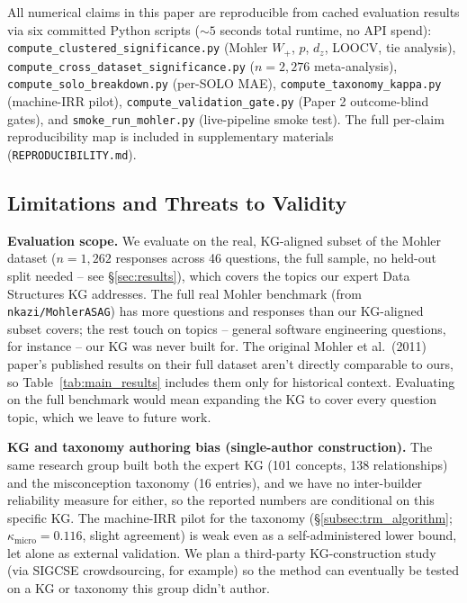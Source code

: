\documentclass[conference]{IEEEtran}
\begin{document}
All numerical claims in this paper are reproducible from cached evaluation
results via six committed Python scripts ($\sim 5$ seconds total runtime,
no API spend): \texttt{compute\_clustered\_significance.py} (Mohler $W_+$,
$p$, $d_z$, LOOCV, tie analysis), \texttt{compute\_cross\_dataset\_significance.py}
($n=2{,}276$ meta-analysis), \texttt{compute\_solo\_breakdown.py}
(per-SOLO MAE), \texttt{compute\_taxonomy\_kappa.py} (machine-IRR pilot),
\texttt{compute\_validation\_gate.py} (Paper 2 outcome-blind gates), and
\texttt{smoke\_run\_mohler.py} (live-pipeline smoke test). The full
per-claim reproducibility map is included in supplementary materials
(\texttt{REPRODUCIBILITY.md}).

\subsection{Limitations and Threats to Validity}
\label{sec:limitations}

\textbf{Evaluation scope.} We evaluate on the real, KG-aligned subset
of the Mohler dataset ($n = 1{,}262$ responses across 46 questions,
the full sample, no held-out split needed -- see \S\ref{sec:results}),
which covers the topics our expert Data Structures KG addresses. The
full real Mohler benchmark (from \texttt{nkazi/MohlerASAG}) has more
questions and responses than our KG-aligned subset covers; the rest
touch on topics -- general software engineering questions, for
instance -- our KG was never built for. The original Mohler et al.\
(2011) paper's published results on their full dataset aren't directly
comparable to ours, so Table~\ref{tab:main_results} includes them only
for historical context. Evaluating on the full benchmark would mean
expanding the KG to cover every question topic, which we leave to
future work.

\textbf{KG and taxonomy authoring bias (single-author construction).}
The same research group built both the expert KG (101 concepts, 138
relationships) and the misconception taxonomy (16 entries), and we
have no inter-builder reliability measure for either, so the reported
numbers are conditional on this specific KG. The machine-IRR pilot for
the taxonomy (\S\ref{subsec:trm_algorithm}; $\kappa_{\text{micro}}=0.116$,
slight agreement) is weak even as a self-administered lower bound,
let alone as external validation. We
plan a third-party KG-construction study (via SIGCSE crowdsourcing,
for example) so the method can eventually be tested on a KG or
taxonomy this group didn't author.
\end{document}
